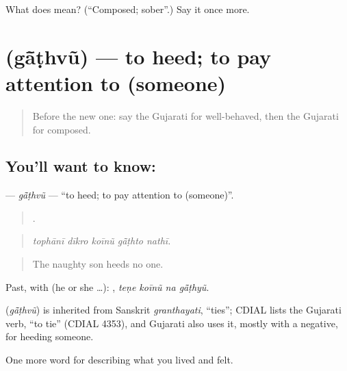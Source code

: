 \begin{tcolorbox}[breakable,colback=teal!4,colframe=teal!35!black,title={Before you move on}]
What does  mean? (\textquotedblleft{}Composed; sober\textquotedblright{}.) Say it once more.
\end{tcolorbox}
\section[\texorpdfstring{\gu{ગાંઠવું} (gā̃ṭhvũ)}{ગાંઠવું (gā̃ṭhvũ)}]{ (gā̃ṭhvũ) — to heed; to pay attention to (someone)}

\label{lesson:GU-C464-gathvu}



\begin{quote}
Before the new one: say the Gujarati for well-behaved, then the Gujarati for composed.
\end{quote}

\subsection*{You'll want to know: }
\textbf{} — \emph{gā̃ṭhvũ} — \textquotedblleft{}to heed; to pay attention to (someone)\textquotedblright{}.

\begin{quote}
    .
\end{quote}

\begin{quote}
\emph{tophānī dīkro koīnũ gā̃ṭhto nathī.}
\end{quote}

\begin{quote}
The naughty son heeds no one.
\end{quote}

Past, with  (he or she …):    , \emph{teṇe koīnũ na gā̃ṭhyũ}.

\begin{cousinweb}
\textbf{} (\emph{gā̃ṭhvũ}) is inherited from Sanskrit \emph{granthayati}, \textquotedblleft{}ties\textquotedblright{}; CDIAL lists the Gujarati verb, \textquotedblleft{}to tie\textquotedblright{} (CDIAL 4353), and Gujarati also uses it, mostly with a negative, for heeding someone.
\end{cousinweb}

\begin{grammarlens}[title={What you've built}]
One more word for describing what you lived and felt.
\end{grammarlens}

